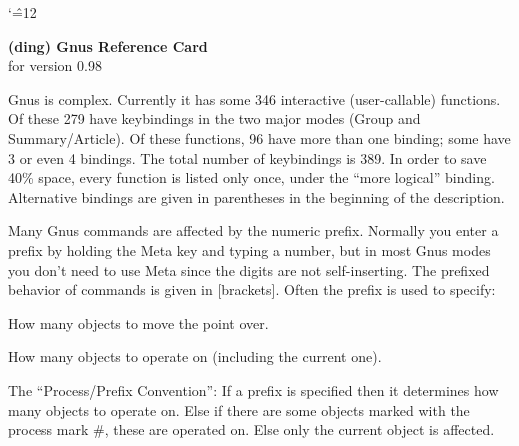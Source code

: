 \textwidth 7.5in \textheight 10in \topmargin -1.0in
\oddsidemargin -0.5in \evensidemargin -0.5in

\twocolumn\scriptsize\pagestyle{empty}
\raggedbottom\raggedright
\newlength{\mywidth}
\setlength{\mywidth}{0.5\textwidth}
\addtolength{\mywidth}{-0.75in}
\newenvironment{keys}
  {\nopagebreak[4]\begin{tabular}{@{}l@{\hspace{\tabcolsep}}p{\mywidth}@{}}}
  {\end{tabular}\\}
\catcode`\^=12 %
\def\Bar{\rule[-0.3ex]{0.5pt}{2ex}\hspace{0.1em}} %

\begin{center}
{\bf\LARGE (ding) Gnus Reference Card\\}
{\normalsize for version 0.98}
\end{center}

Gnus is complex. Currently it has some 346 interactive (user-callable)
functions. Of these 279 have keybindings in the two major modes (Group and
Summary/Article). Of these functions, 96 have more than one binding; some
have 3 or even 4 bindings. The total number of keybindings is 389. In order
to save 40\% space, every function is listed only once, under the ``more
logical'' binding. Alternative bindings are given in parentheses in the
beginning of the description.

Many Gnus commands are affected by the numeric prefix. Normally you enter a
prefix by holding the Meta key and typing a number, but in most Gnus modes
you don't need to use Meta since the digits are not self-inserting. The
prefixed behavior of commands is given in [brackets]. Often the prefix is
used to specify:

\quad [distance] How many objects to move the point over.

\quad [scope] How many objects to operate on (including the current one).

\quad [p/p] The ``Process/Prefix Convention'': If a prefix is specified
then it determines how many objects to operate on. Else if there are some
objects marked with the process mark \#, these are operated on. Else only
the current object is affected.

